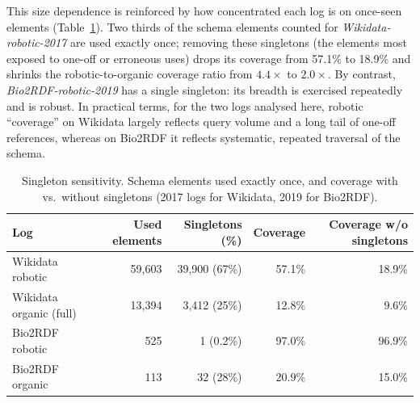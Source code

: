 \documentclass[sw]{iosart2x}
\providecommand{\DIFaddbeginFL}{} %
\providecommand{\DIFaddendFL}{} %
\providecommand{\DIFdelbeginFL}{} %
\providecommand{\DIFdelendFL}{} %
\providecommand{\DIFscaledelfig}{0.5}
\newlength{\DIFdelgraphicswidth} %
\newlength{\DIFdelgraphicsheight} %
\providecommand{\DIFaddincludegraphics}[2][]{{\color{blue}\fbox{\DIFOincludegraphics[#1]{#2}}}} %
\providecommand{\DIFdelincludegraphics}[2][]{%
\sbox{\DIFdelgraphicsbox}{\DIFOincludegraphics[#1]{#2}}%
\settoboxwidth{\DIFdelgraphicswidth}{\DIFdelgraphicsbox} %
\settoboxtotalheight{\DIFdelgraphicsheight}{\DIFdelgraphicsbox} %
\scalebox{\DIFscaledelfig}{%
\parbox[b]{\DIFdelgraphicswidth}{\usebox{\DIFdelgraphicsbox}\\[-\baselineskip] \rule{\DIFdelgraphicswidth}{0em}}\llap{\resizebox{\DIFdelgraphicswidth}{\DIFdelgraphicsheight}{%
\setlength{\unitlength}{\DIFdelgraphicswidth}%
\begin{picture}(1,1)%
\thicklines\linethickness{2pt} %
{\color[rgb]{1,0,0}\put(0,0){\framebox(1,1){}}}%
{\color[rgb]{1,0,0}\put(0,0){\line( 1,1){1}}}%
{\color[rgb]{1,0,0}\put(0,1){\line(1,-1){1}}}%
\end{picture}%
}\hspace*{3pt}}} %
} %
\DeclareRobustCommand{\DIFaddbeginFL}{\DIFOaddbeginFL \let\includegraphics\DIFaddincludegraphics} %
\DeclareRobustCommand{\DIFaddendFL}{\DIFOaddendFL \let\includegraphics\DIFOincludegraphics} %
\DeclareRobustCommand{\DIFdelbeginFL}{\DIFOdelbeginFL \let\includegraphics\DIFdelincludegraphics} %
\DeclareRobustCommand{\DIFdelendFL}{\DIFOaddendFL \let\includegraphics\DIFOincludegraphics} %
\begin{document}
This size dependence is reinforced by how concentrated each log is on once-seen elements (Table~\ref{tab:singletons}). Two thirds of the schema elements counted for \emph{Wikidata-robotic-2017} are used exactly once; removing these singletons (the elements most exposed to one-off or erroneous uses) drops its coverage from 57.1\% to 18.9\% and shrinks the robotic-to-organic coverage ratio from $4.4\times$ to $2.0\times$. By contrast, \emph{Bio2RDF-robotic-2019} has a single singleton: its breadth is exercised repeatedly and is robust. In practical terms, for the two logs analysed here, robotic ``coverage'' on Wikidata largely reflects query volume and a long tail of one-off references, whereas on Bio2RDF it reflects systematic, repeated traversal of the schema. 



\begin{table}[ht]
\centering
\caption{Singleton sensitivity. Schema elements used exactly once, and coverage with vs.\ without singletons (2017 logs for Wikidata, 2019 for Bio2RDF).}
\label{tab:singletons}
\DIFdelbeginFL %
\DIFdelendFL \DIFaddbeginFL \begin{tabular}{l|r|r|r|r}
\hline
Log & Used elements & Singletons (\%) & Coverage & Coverage w/o singletons \\
\hline
Wikidata robotic & 59,603 & 39,900 (67\%) & 57.1\% & 18.9\% \\
Wikidata organic (full) & 13,394 & 3,412 (25\%) & 12.8\% & 9.6\% \\
Bio2RDF robotic & 525 & 1 (0.2\%) & 97.0\% & 96.9\% \\
Bio2RDF organic & 113 & 32 (28\%) & 20.9\% & 15.0\% \\
\hline
\end{tabular}
\DIFaddendFL \end{table}
\end{document}
